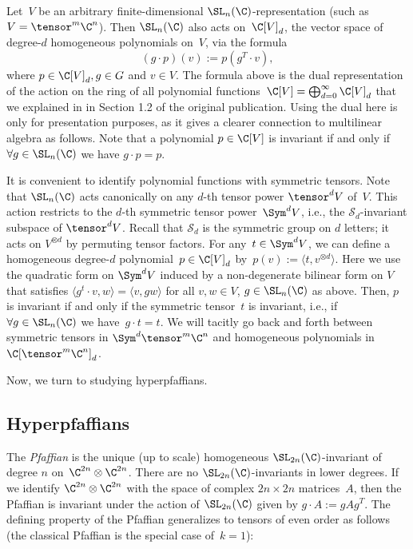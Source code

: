 Let~$V$ be an arbitrary finite-dimensional $\SL_n(\C)$-representation (such as $V = \tensor^m\C^n$).
Then $\SL_n(\C)$ also acts on~$\C[V]_d$, the vector space of degree-$d$ homogeneous polynomials on~$V$, via the formula
\[
(g \cdot p)(v) := p(g^T \cdot v),
\]
where $p \in \C[V]_d, g \in G$ and $v \in V$.
The formula above is the dual representation of the action on the ring of all polynomial functions~$\C[V] = \bigoplus_{d=0}^\infty \C[V]_d$ that we explained in in Section 1.2 of the original publication.
Using the dual here is only for presentation purposes, as it gives a clearer connection to multilinear algebra as follows.
%
Note that a polynomial $p \in \C[V]$ is invariant if and only if $\forall g \in \SL_n(\C)$ we have $g \cdot p=p$.
%
%

It is convenient to identify polynomial functions with symmetric tensors.
Note that $\SL_n(\C)$ acts canonically on any $d$-th tensor power $\tensor^d V$ of~$V$.
This action restricts to the $d$-th symmetric tensor power~$\Sym^d V$, i.e., the $\mathcal{S}_d$-invariant subspace of $\tensor^d V$. Recall that $\mathcal{S}_d$ is the symmetric group on $d$ letters; it acts on $V^{\otimes d}$ by permuting tensor factors.
For any~$t \in \Sym^d V$, we can define a homogeneous degree-$d$ polynomial~$p\in\C[V]_d$ by~$p(v) := \langle t, v^{\otimes d}\rangle$.
Here we use the quadratic form on $\Sym^d V$ induced by a non-degenerate bilinear form on $V$ that satisfies $\langle g^t\cdot v, w\rangle = \langle v,g w\rangle$ for all $v,w \in V$, $g \in \SL_n(\C)$ as above.
Then, $p$ is invariant if and only if the symmetric tensor~$t$ is invariant, i.e., if $\forall g \in \SL_n(\C)$ we have~$g \cdot t=t$.
We will tacitly go back and forth between symmetric tensors in $\Sym^d \tensor^m \C^n$ and homogeneous polynomials in~$\C[\tensor^m \C^n]_d$.

Now, we turn to studying hyperpfaffians.





%
%
%
%

%
%
%
%
%
%
%

%
\subsection{Hyperpfaffians}
%
The \emph{Pfaffian} is the unique (up to scale) homogeneous $\SL_{2n}(\C)$-invariant of degree $n$ on~$\C^{2n}\otimes\C^{2n}$.
There are no $\SL_{2n}(\C)$-invariants in lower degrees.
%
If we identify $\C^{2n} \otimes \C^{2n}$ with the space of complex $2n\times 2n$ matrices~$A$, then the Pfaffian is invariant under the action of $\SL_{2n}(\C)$ given by $g \cdot A := gAg^T$.
The defining property of the Pfaffian generalizes to tensors of even order as follows (the classical Pfaffian is the special case of~$k=1$):

